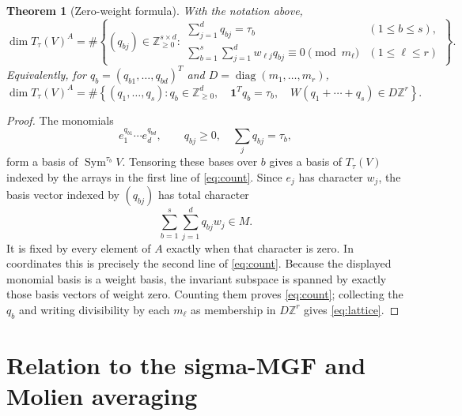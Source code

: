 \documentclass[11pt]{article}
\newtheorem{theorem}{Theorem}
\newcommand{\Sym}{\operatorname{Sym}}
\newcommand{\one}{\mathbf 1}
\begin{document}
\begin{theorem}[Zero-weight formula]\label{thm:main}
With the notation above,
\begin{equation}\label{eq:count}
 \dim T_\tau(V)^A=
 \#\left\{(q_{bj})\in\mathbb Z_{\ge0}^{s\times d}:
 \begin{array}{ll}
 \displaystyle\sum_{j=1}^{d}q_{bj}=\tau_b
   & (1\le b\le s),\\[4pt]
 \displaystyle\sum_{b=1}^{s}\sum_{j=1}^{d}
 w_{\ell j}q_{bj}\equiv0\pmod {m_\ell}
   & (1\le\ell\le r)
 \end{array}\right\}.
\end{equation}
Equivalently, for $q_b=(q_{b1},\ldots,q_{bd})^T$ and
$D=\operatorname{diag}(m_1,\ldots,m_r)$,
\begin{equation}\label{eq:lattice}
 \dim T_\tau(V)^A=
 \#\left\{(q_1,\ldots,q_s):
 q_b\in\mathbb Z_{\ge0}^{d},\quad
 \one^Tq_b=\tau_b,\quad
 W(q_1+\cdots+q_s)\in D\mathbb Z^r\right\}.
\end{equation}
\end{theorem}

\begin{proof}
The monomials
\[
 e_1^{q_{b1}}\cdots e_d^{q_{bd}},\qquad
 q_{bj}\ge0,\quad \sum_jq_{bj}=\tau_b,
\]
form a basis of $\Sym^{\tau_b}V$.  Tensoring these bases over $b$ gives a
basis of $T_\tau(V)$ indexed by the arrays in the first line of
\eqref{eq:count}.  Since $e_j$ has character $w_j$, the basis vector indexed
by $(q_{bj})$ has total character
\[
 \sum_{b=1}^{s}\sum_{j=1}^{d}q_{bj}w_j\in M.
\]
It is fixed by every element of $A$ exactly when that character is zero.  In
coordinates this is precisely the second line of \eqref{eq:count}.  Because
the displayed monomial basis is a weight basis, the invariant subspace is
spanned by exactly those basis vectors of weight zero.  Counting them proves
\eqref{eq:count}; collecting the $q_b$ and writing divisibility by each
$m_\ell$ as membership in $D\mathbb Z^r$ gives \eqref{eq:lattice}.
\end{proof}

\section{Relation to the sigma-MGF and Molien averaging}
\end{document}

